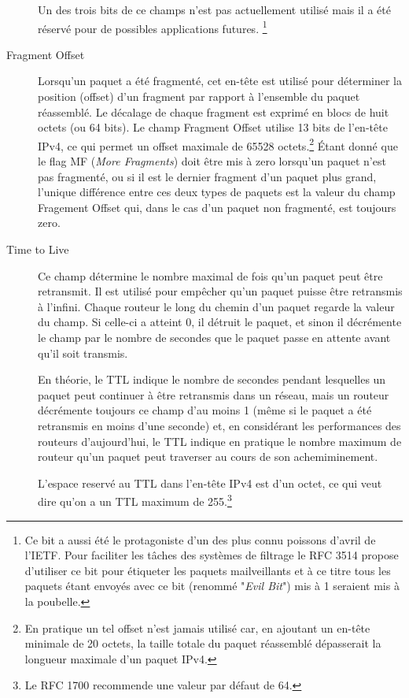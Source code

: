 \begin{description}
Un des trois bits de ce champs n'est pas actuellement utilisé mais il a été
réservé pour de possibles applications futures.
\footnote {Ce bit a aussi été le protagoniste d'un des plus connu poissons
d'avril de l'IETF. Pour faciliter les tâches des systèmes de filtrage 
le RFC 3514 propose d'utiliser ce bit pour étiqueter les paquets mailveillants et à ce
titre tous les paquets étant envoyés avec ce bit (renommé "{\it Evil Bit}") 
mis à 1 seraient mis à la poubelle.}

\item [Fragment Offset]
Lorsqu'un paquet a été fragmenté, cet en-tête est utilisé pour déterminer la
position (offset) d'un fragment par rapport à l'ensemble du paquet réassemblé.
Le décalage de chaque fragment est exprimé en blocs de huit octets (ou 64
bits). Le champ Fragment Offset utilise 13 bits de l'en-tête IPv4, ce qui permet
un offset maximale de 65528 octets.\footnote {En pratique un tel offset n'est
jamais utilisé car, en ajoutant un en-tête minimale de 20 octets, la taille
totale du paquet réassemblé dépasserait la longueur maximale d'un paquet IPv4.}
Étant donné que le flag MF ({\it More Fragments}) doit être mis à zero lorsqu'un paquet 
n'est pas fragmenté, ou si il est le dernier fragment d'un paquet plus grand, 
l'unique différence entre ces deux types de paquets est la valeur du 
champ Fragement Offset qui, dans le cas d'un paquet non fragmenté, est
toujours zero.

\item [Time to Live]
Ce champ détermine le nombre maximal de fois qu'un paquet peut être retransmit. 
Il est utilisé pour empêcher qu'un paquet puisse être retransmis à l'infini.
Chaque routeur le long du chemin d'un paquet regarde la valeur du champ. Si celle-ci
a atteint 0, il détruit le paquet, et sinon il décrémente le champ par le
nombre de secondes que le paquet passe en attente avant qu'il soit transmis.

En théorie, le TTL indique le nombre de secondes pendant lesquelles un paquet
peut continuer à être retransmis dans un réseau, mais un routeur 
 décrémente toujours ce champ d'au moins 1 (même si le paquet a été
retransmis en moins d'une seconde) et, en considérant les performances des routeurs
d'aujourd'hui, le TTL indique en pratique le nombre maximum de routeur qu'un paquet
 peut traverser au cours de son achemiminement.

L'espace reservé au TTL dans l'en-tête IPv4 est d'un octet, ce qui veut dire qu'on a un 
TTL maximum de 255.\footnote {Le RFC 1700 recommende une valeur par défaut de 64.}


\end{description}

